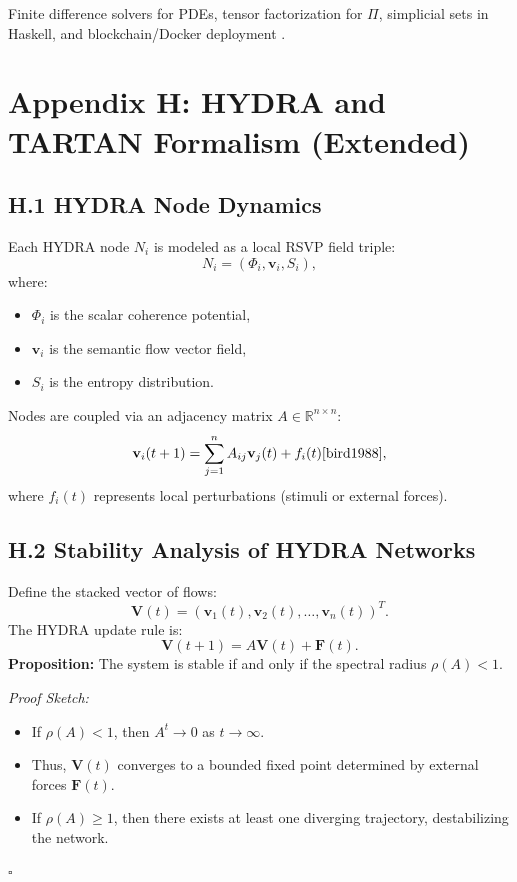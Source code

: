 \documentclass[12pt]{article}
\begin{document}
{{Finite difference solvers for PDEs, tensor factorization for \(\Pi\), simplicial sets in Haskell, and blockchain/Docker deployment \citep{bird1988, milewski2018}.

\section*{Appendix H: HYDRA and TARTAN Formalism (Extended)}

\subsection*{H.1 HYDRA Node Dynamics}

Each HYDRA node \(N_i\) is modeled as a local RSVP field triple:
\[
N_i = (\Phi_i, \mathbf{v}_i, S_i),
\]
where:
\begin{itemize}
    \item \(\Phi_i\) is the scalar coherence potential,
    \item \(\mathbf{v}_i\) is the semantic flow vector field,
    \item \(S_i\) is the entropy distribution.
\end{itemize}

Nodes are coupled via an adjacency matrix \(A \in \mathbb{R}^{n \times n}\):
\[
\mathbf{v}_i(t+1) = \sum_{j=1}^n A_{ij} \mathbf{v}_j(t) + f_i(t) \cite{bird1988},
\]
where \(f_i(t)\) represents local perturbations (stimuli or external forces).

\subsection*{H.2 Stability Analysis of HYDRA Networks}

Define the stacked vector of flows:
\[
\mathbf{V}(t) = (\mathbf{v}_1(t), \mathbf{v}_2(t), \dots, \mathbf{v}_n(t))^T.
\]
The HYDRA update rule is:
\[
\mathbf{V}(t+1) = A \mathbf{V}(t) + \mathbf{F}(t).
\]
\textbf{Proposition:} The system is stable if and only if the spectral radius \(\rho(A) < 1\).

\textit{Proof Sketch:}
\begin{itemize}
    \item If \(\rho(A) < 1\), then \(A^t \to 0\) as \(t \to \infty\).
    \item Thus, \(\mathbf{V}(t)\) converges to a bounded fixed point determined by external forces \(\mathbf{F}(t)\).
    \item If \(\rho(A) \geq 1\), then there exists at least one diverging trajectory, destabilizing the network.
\end{itemize}
\(\square\)

}}
\end{document}
